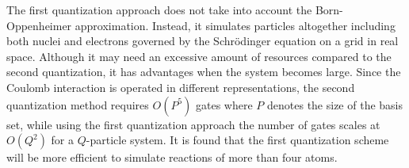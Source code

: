 \documentclass[8.5pt,twoside,twocolumn]{article}
\begin{document}
The first quantization approach does not take into account
the Born-Oppenheimer approximation.
Instead, it simulates particles altogether
including both nuclei and electrons
governed by the Schr\"{o}dinger equation
on a grid in real space.\cite{first_quantization_1,first_quantization_2,Polynomial_time_algorithm}
Although it may need an excessive amount of resources
compared to the second quantization,
it has advantages when the system becomes large.
Since the Coulomb interaction is operated in
different representations,
the second quantization method requires $O(P^5)$ gates where $P$
denotes the size of the basis set,
while using the first quantization approach the number of gates
scales at $O(Q^2)$
for a $Q$-particle system.\cite{Polynomial_time_algorithm,Simulating_chemistry_computer}
It is found that the first quantization scheme will be
more efficient to simulate reactions
of more than four atoms.\cite{Polynomial_time_algorithm}



\end{document}
